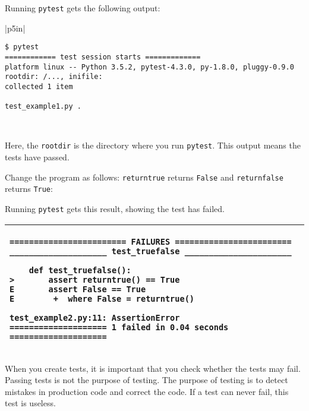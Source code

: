 Running {\tt pytest} gets the following output:

\vspace{0.2in}

\noindent
\begin{tabular}{|p{5in}|}\hline
\begin{verbatim}
$ pytest
============ test session starts =============
platform linux -- Python 3.5.2, pytest-4.3.0, py-1.8.0, pluggy-0.9.0
rootdir: /..., inifile:
collected 1 item

test_example1.py .                                
\end{verbatim}
\\ \hline
\end{tabular}
\vspace{0.2in}

Here, the {\tt rootdir} is the directory where you run {\tt pytest}.
This output means the tests have passed.

Change the program  as follows: {\tt returntrue} returns {\tt False}
and {\tt returnfalse} returns {\tt True}:

\resetlinenumber[1]
\linenumbers
\begin{tt}
  
\end{tt}
\nolinenumbers

Running {\tt pytest} gets this result, showing the test has failed.


\vspace{0.2in}

\noindent
\begin{tabular}{|p{5in}|}\hline
\begin{verbatim}
======================== FAILURES ========================
____________________ test_truefalse ______________________

    def test_truefalse():
>       assert returntrue() == True
E       assert False == True
E        +  where False = returntrue()

test_example2.py:11: AssertionError
==================== 1 failed in 0.04 seconds ====================
\end{verbatim}
\\ \hline
\end{tabular}
\vspace{0.2in}


When you create tests, it is important that you check whether the
tests may fail. Passing tests is not the purpose of testing.  The
purpose of testing is to detect mistakes in production code and
correct the code.  If a test can never fail, this test is useless.


